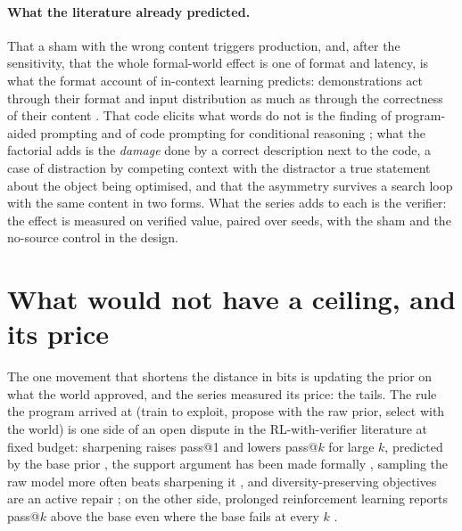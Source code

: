 \documentclass[11pt]{article}
\begin{document}
\paragraph{What the literature already predicted.} That a sham with the
wrong content triggers production, and, after the sensitivity, that the
whole formal-world effect is one of format and latency, is what the
format account of in-context learning predicts: demonstrations act through
their format and input distribution as much as through the correctness of
their content \citep{min2022rethinking}. That code elicits what words do
not is the finding of program-aided prompting \citep{gao2023pal,chen2023pot}
and of code prompting for conditional reasoning \citep{puerto2024code};
what the factorial adds is the \emph{damage} done by a correct description
next to the code, a case of distraction by competing context
\citep{shi2023distracted} with the distractor a true statement about the
object being optimised, and that the asymmetry survives a search loop with
the same content in two forms. What the series adds to each is the
verifier: the effect is measured on verified value, paired over seeds,
with the sham and the no-source control in the design.

\section{What would not have a ceiling, and its price}
\label{sec:organ}

The one movement that shortens the distance in bits is updating the prior
on what the world approved, and the series measured its price: the tails.
The rule the program arrived at (train to exploit, propose with the raw
prior, select with the world) is one side of an open dispute in the
RL-with-verifier literature at fixed budget: sharpening raises pass@1 and
lowers pass@$k$ for large $k$, predicted by the base prior
\citep{yue2025rlvr}, the support argument has been made formally
\citep{wu2025leash}, sampling the raw model more often beats sharpening it
\citep{brown2024monkeys}, and diversity-preserving objectives are an active
repair \citep{li2025darling,zhang2025verbalized}; on the other side,
prolonged reinforcement learning reports pass@$k$ above the base even where
the base fails at every $k$ \citep{liu2025prorl}.
\end{document}
